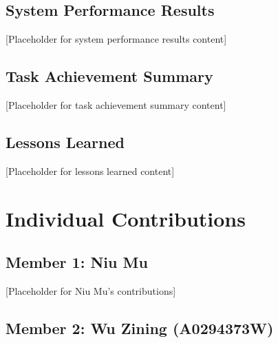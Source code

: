 \documentclass[12pt,a4paper]{article}
\begin{document}
\subsection{System Performance Results}


[Placeholder for system performance results content]

\subsection{Task Achievement Summary}


[Placeholder for task achievement summary content]

\subsection{Lessons Learned}


[Placeholder for lessons learned content]

\section{Individual Contributions}


\subsection{Member 1: Niu Mu}


[Placeholder for Niu Mu's contributions]

\subsection{Member 2: Wu Zining (A0294373W)}
\end{document}
